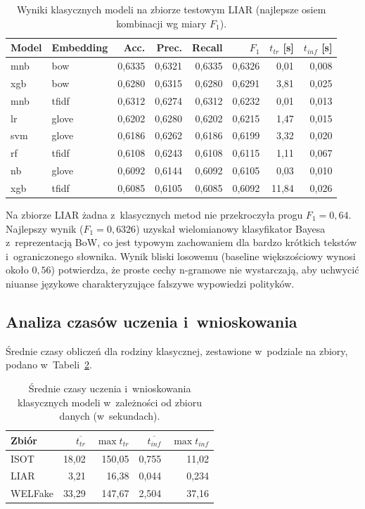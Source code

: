 \begin{table}[ht]
\centering
\caption{Wyniki klasycznych modeli na zbiorze testowym LIAR
(najlepsze osiem kombinacji wg miary $F_1$).}
\label{tab:klas_liar}
\begin{tabular}{llrrrrrr}
\toprule
Model & Embedding & Acc. & Prec. & Recall & $F_1$ & $t_{tr}$ [s] & $t_{inf}$ [s] \\
\midrule
mnb & bow      & 0,6335 & 0,6321 & 0,6335 & 0,6326 & 0,01  & 0,008 \\
xgb & bow      & 0,6280 & 0,6315 & 0,6280 & 0,6291 & 3,81  & 0,025 \\
mnb & tfidf    & 0,6312 & 0,6274 & 0,6312 & 0,6232 & 0,01  & 0,013 \\
lr  & glove    & 0,6202 & 0,6280 & 0,6202 & 0,6215 & 1,47  & 0,015 \\
svm & glove    & 0,6186 & 0,6262 & 0,6186 & 0,6199 & 3,32  & 0,020 \\
rf  & tfidf    & 0,6108 & 0,6243 & 0,6108 & 0,6115 & 1,11  & 0,067 \\
nb  & glove    & 0,6092 & 0,6144 & 0,6092 & 0,6105 & 0,03  & 0,010 \\
xgb & tfidf    & 0,6085 & 0,6105 & 0,6085 & 0,6092 & 11,84 & 0,026 \\
\bottomrule
\end{tabular}
\end{table}

Na zbiorze LIAR żadna z~klasycznych metod nie przekroczyła progu
\(F_1 = 0{,}64\). Najlepszy wynik (\(F_1 = 0{,}6326\)) uzyskał
wielomianowy klasyfikator Bayesa z~reprezentacją BoW, co jest typowym
zachowaniem dla bardzo krótkich tekstów i~ograniczonego słownika.
Wynik bliski losowemu (baseline większościowy wynosi około
\(0{,}56\)) potwierdza, że proste cechy n-gramowe nie wystarczają,
aby uchwycić niuanse językowe charakteryzujące fałszywe wypowiedzi
polityków.

\subsection{Analiza czasów uczenia i~wnioskowania}
\label{sec:wyniki_klasyczne_czas}

Średnie czasy obliczeń dla rodziny klasycznej, zestawione w~podziale
na zbiory, podano w~Tabeli~\ref{tab:klas_czasy}.

\begin{table}[ht]
\centering
\caption{Średnie czasy uczenia i~wnioskowania klasycznych modeli
w~zależności od zbioru danych (w~sekundach).}
\label{tab:klas_czasy}
\begin{tabular}{lrrrr}
\toprule
Zbiór & $\overline{t_{tr}}$ & $\max{t_{tr}}$ & $\overline{t_{inf}}$ & $\max{t_{inf}}$ \\
\midrule
ISOT    & 18,02  & 150,05 & 0,755 & 11,02  \\
LIAR    & 3,21   & 16,38  & 0,044 & 0,234  \\
WELFake & 33,29  & 147,67 & 2,504 & 37,16  \\
\bottomrule
\end{tabular}
\end{table}

